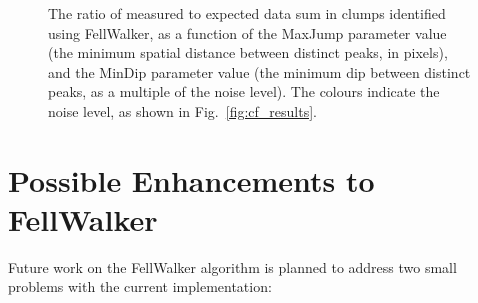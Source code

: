 \documentclass[final,authoryear,5p,times,twocolumn]{elsarticle}
\begin{document}
\begin{figure}
\hspace*{10pt}
\caption{The ratio of measured to expected data sum in clumps identified
using FellWalker, as a function of the MaxJump parameter value (the
minimum spatial distance between distinct peaks, in pixels), and the
MinDip parameter value (the minimum dip between distinct peaks, as a
multiple of the noise level). The colours indicate the noise level, as
shown in Fig.~\ref{fig:cf_results}.}
\label{fig:fw_results}
\end{figure}

\section{Possible Enhancements to FellWalker}
Future work on the FellWalker algorithm is planned to address two small
problems with the current implementation:
\end{document}
